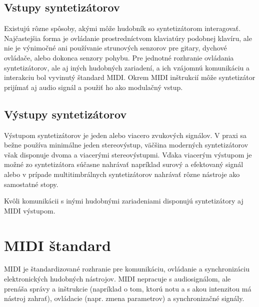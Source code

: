 \subsection{Vstupy syntetizátorov}
Existujú rôzne spôsoby, akými môže hudobník so syntetizátorom interagovať. Najčastejšia forma je ovládanie prostredníctvom klaviatúry podobnej klavíru, ale nie je výnimočné ani používanie strunových senzorov pre gitary, dychové ovládače, alebo dokonca senzory pohybu. Pre jednotné rozhranie ovládania syntetizátorov, ale aj iných hudobných zariadení, a ich vzájomnú komunikáciu a interakciu bol vyvinutý štandard MIDI. Okrem MIDI inštrukcií môže syntetizátor prijímať aj audio signál a použiť ho ako modulačný vstup.

\subsection{Výstupy syntetizátorov}
Výstupom syntetizátorov je jeden alebo viacero zvukových signálov. V praxi sa bežne používa minimálne jeden stereovýstup, väčšina moderných syntetizátorov však disponuje dvoma a viacerými stereovýstupmi. Vďaka viacerým výstupom je možné zo syntetizátora súčasne nahrávať napríklad surový a efektovaný signál alebo v prípade multitimbrálnych syntetizátorov nahrávať rôzne nástroje ako samostatné stopy. 

Kvôli komunikácii s inými hudobnými zariadeniami disponujú syntetizátory aj MIDI výstupom.

\section{MIDI štandard}
\label{midi}

MIDI je štandardizované rozhranie pre komunikáciu, ovládanie a synchronizáciu elektronických hudobných nástrojov. MIDI nepracuje s audiosignálom, ale prenáša správy a inštrukcie (napríklad o tom, ktorú notu a s akou intenzitou má nástroj zahrať), ovládacie (napr. zmena parametrov) a synchronizačné signály.

